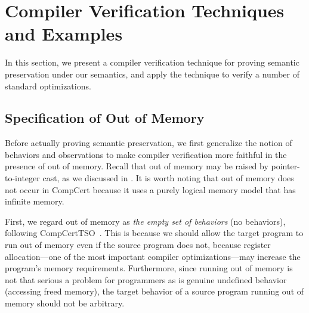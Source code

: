 \section{Compiler Verification Techniques and Examples}
\label{sec:intptrcast:compiler-verification}

In this section, we present a compiler verification technique for proving semantic preservation
under our semantics, and apply the technique to verify a number of standard optimizations.



\subsection{Specification of Out of Memory}
\label{sec:intptrcast:formal-semantics:oom}

Before actually proving semantic preservation, we first generalize the notion of behaviors and
observations to make compiler verification more faithful in the presence of out of memory.  Recall
that out of memory may be raised by pointer-to-integer cast, as we discussed in
.  It is worth noting that out of memory does not
occur in CompCert because it uses a purely logical memory model that has infinite memory.

First, we regard out of memory as \emph{the empty set of behaviors} (\ie no behaviors), following
CompCertTSO~\cite{vsevvcik2013compcerttso}.  This is because we should allow the target program to
run out of memory even if the source program does not, because register allocation---one of the most
important compiler optimizations---may increase the program's memory requirements.  Furthermore,
since running out of memory is not that serious a problem for programmers as is genuine undefined
behavior (\eg accessing freed memory), the target behavior of a source program running out of memory
should not be arbitrary.


